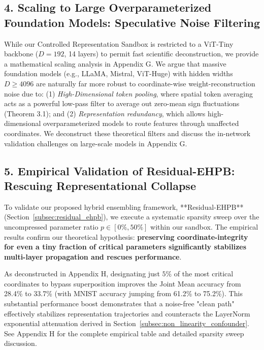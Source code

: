 \subsection{4. Scaling to Large Overparameterized Foundation Models: Speculative Noise Filtering}
\label{subsec:foundation_scaling}

While our Controlled Representation Sandbox is restricted to a ViT-Tiny backbone ($D=192$, 14 layers) to permit fast scientific deconstruction, we provide a mathematical scaling analysis in Appendix G. We argue that massive foundation models (e.g., LLaMA, Mistral, ViT-Huge) with hidden widths $D \geq 4096$ are naturally far more robust to coordinate-wise weight-reconstruction noise due to: (1) \textit{High-Dimensional token pooling}, where spatial token averaging acts as a powerful low-pass filter to average out zero-mean sign fluctuations (Theorem 3.1); and (2) \textit{Representation redundancy}, which allows high-dimensional overparameterized models to route features through unaffected coordinates. We deconstruct these theoretical filters and discuss the in-network validation challenges on large-scale models in Appendix G.

\subsection{5. Empirical Validation of Residual-EHPB: Rescuing Representational Collapse}
\label{subsec:residual_ehpb_empirical}

To validate our proposed hybrid ensembling framework, **Residual-EHPB** (Section~\ref{subsec:residual_ehpb}), we execute a systematic sparsity sweep over the uncompressed parameter ratio $p \in [0\%, 50\%]$ within our sandbox. The empirical results confirm our theoretical hypothesis: \textbf{preserving coordinate-integrity for even a tiny fraction of critical parameters significantly stabilizes multi-layer propagation and rescues performance}. 

As deconstructed in Appendix H, designating just $5\%$ of the most critical coordinates to bypass superposition improves the Joint Mean accuracy from 28.4\% to 33.7\% (with MNIST accuracy jumping from 61.2\% to 75.2\%). This substantial performance boost demonstrates that a noise-free "clean path" effectively stabilizes representation trajectories and counteracts the LayerNorm exponential attenuation derived in Section~\ref{subsec:non_linearity_confounder}. See Appendix H for the complete empirical table and detailed sparsity sweep discussion.

